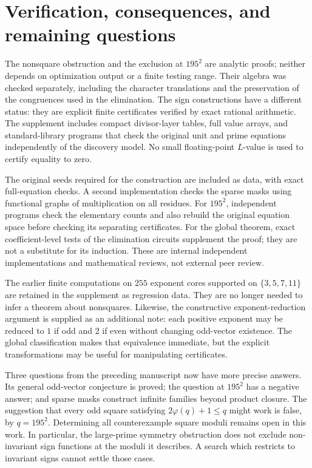 \documentclass[11pt]{amsart}
\theoremstyle{definition}
\theoremstyle{remark}
\numberwithin{equation}{section}
\begin{document}
\section{Verification, consequences, and remaining questions}

The nonsquare obstruction and the exclusion at $195^2$ are analytic
proofs; neither depends on optimization output or a finite testing range.
Their algebra was checked separately, including the character translations
and the preservation of the congruences used in the elimination.
The sign constructions have a different status: they are explicit finite
certificates verified by exact rational arithmetic. The supplement includes
compact divisor-layer tables, full value arrays, and standard-library
programs that check the original unit and prime equations independently
of the discovery model. No small floating-point $L$-value is used to
certify equality to zero.

The original seeds required for the construction are included as data,
with exact full-equation checks. A second implementation checks the sparse
masks using functional graphs of multiplication on all residues. For
$195^2$, independent programs check the elementary counts and also rebuild
the original equation space before checking its separating certificates.
For the global theorem, exact coefficient-level tests of the elimination
circuits supplement the proof; they are not a substitute for its induction.
These are internal independent implementations and mathematical reviews,
not external peer review.

The earlier finite computations on $255$ exponent cores supported on
$\{3,5,7,11\}$ are retained in the supplement as regression data.
They are no longer needed to infer a theorem about nonsquares. Likewise,
the constructive exponent-reduction argument is supplied as an additional
note: each positive exponent may be reduced to $1$ if odd and $2$ if even
without changing odd-vector existence. The global classification makes
that equivalence immediate, but the explicit transformations may be useful
for manipulating certificates.

Three questions from the preceding manuscript now have more precise
answers. Its general odd-vector conjecture is proved; the question at
$195^2$ has a negative answer; and sparse masks construct infinite families
beyond product closure. The suggestion that every odd square satisfying
$2\varphi(q)+1\le q$ might work is false, by $q=195^2$.
Determining all counterexample square moduli remains open in this work.
In particular, the large-prime symmetry obstruction does not exclude
non-invariant sign functions at the moduli it describes. A search which
restricts to invariant signs cannot settle those cases.
\end{document}
